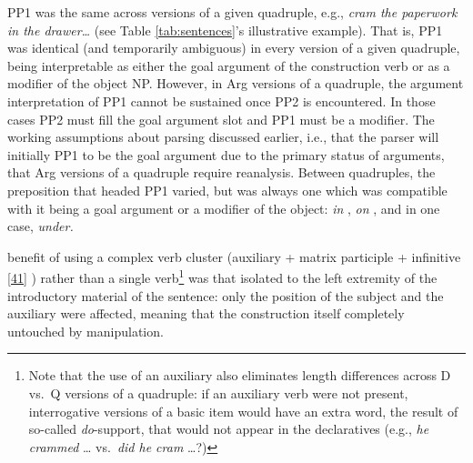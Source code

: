 \documentclass[12pt,oneside]{book}
\let\rmarkdownfootnote\footnote%
\def\footnote{\protect\rmarkdownfootnote}
\begin{document}
PP1 was the same across versions of a given quadruple, e.g., \emph{cram the paperwork in the drawer\ldots{}} (see Table \ref{tab:sentences}'s illustrative example). That is, PP1 was identical (and temporarily ambiguous) in every version of a given quadruple, being interpretable as either the goal argument of the construction verb or as a modifier of the object NP. However, in Arg versions of a quadruple, the argument interpretation of PP1 cannot be sustained once PP2 is encountered. In those cases PP2 must fill the goal argument slot and PP1 must be a modifier. The working assumptions about parsing discussed earlier, i.e., that the parser will initially  PP1 to be the goal argument due to the primary status of arguments,  that  Arg versions of a quadruple require  reanalysis. Between quadruples, the preposition that headed PP1 varied, but was always one which was compatible with it being a goal argument or a modifier of the object: \emph{in} , \emph{on} , and in one case, \emph{under.}

 benefit of using a complex verb cluster (auxiliary + matrix participle + infinitive \ref{41} ) rather than a single verb\footnote{Note that the use of an auxiliary also eliminates length differences across D vs.~Q versions of a quadruple: if an auxiliary verb were not present, interrogative versions of a basic item would have an extra word, the result of so-called \emph{do}-support, that would not appear in the declaratives (e.g., \emph{he crammed} \ldots{} vs.~\emph{did he cram} \ldots{}?)} was that  isolated  to the left extremity of the introductory material of the sentence:  only the position of the subject and the auxiliary were affected, meaning that the construction itself  completely untouched by  manipulation. 
\end{document}
